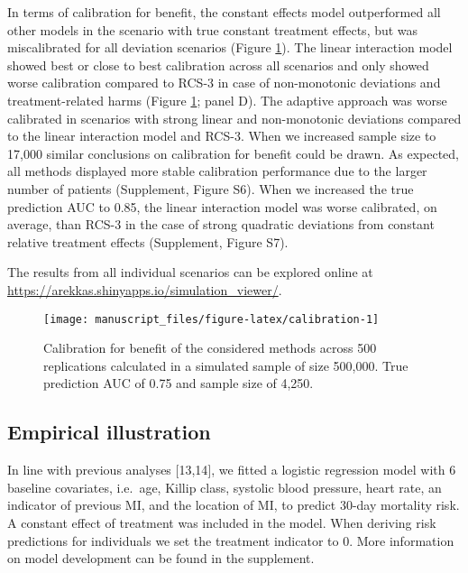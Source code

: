 \documentclass[]{elsarticle} %
\begin{document}
In terms of calibration for benefit, the constant effects model
outperformed all other models in the scenario with true constant
treatment effects, but was miscalibrated for all deviation scenarios
(Figure \ref{fig:calibration}). The linear interaction model showed best
or close to best calibration across all scenarios and only showed worse
calibration compared to RCS-3 in case of non-monotonic deviations and
treatment-related harms (Figure \ref{fig:calibration}; panel D). The
adaptive approach was worse calibrated in scenarios with strong linear
and non-monotonic deviations compared to the linear interaction model
and RCS-3. When we increased sample size to 17,000 similar conclusions
on calibration for benefit could be drawn. As expected, all methods
displayed more stable calibration performance due to the larger number
of patients (Supplement, Figure S6). When we increased the true
prediction AUC to 0.85, the linear interaction model was worse
calibrated, on average, than RCS-3 in the case of strong quadratic
deviations from constant relative treatment effects (Supplement, Figure
S7).

The results from all individual scenarios can be explored online at
\url{https://arekkas.shinyapps.io/simulation_viewer/}.

\begin{figure}
\texttt{[image: manuscript\_files/figure-latex/calibration-1]} \caption{Calibration for benefit of the considered methods across 500 replications calculated in a simulated sample of size 500,000. True prediction AUC of 0.75 and sample size of 4,250.}\label{fig:calibration}
\end{figure}

\hypertarget{empirical-illustration-1}{%
\subsection{Empirical illustration}\label{empirical-illustration-1}}

In line with previous analyses {[}13,14{]}, we fitted a logistic
regression model with 6 baseline covariates, i.e.~age, Killip class,
systolic blood pressure, heart rate, an indicator of previous MI, and
the location of MI, to predict 30-day mortality risk. A constant effect
of treatment was included in the model. When deriving risk predictions
for individuals we set the treatment indicator to 0. More information on
model development can be found in the supplement.
\end{document}
